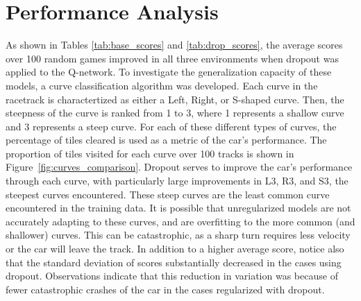 \documentclass{article}
\begin{document}
\section{Performance Analysis}
As shown in Tables \ref{tab:base_scores} and \ref{tab:drop_scores},
the average scores over 100 random games improved in all three
environments when dropout was applied to the Q-network. To
investigate the generalization capacity of these models, a curve 
classification algorithm was developed. Each curve in the racetrack is
charactertized as either a Left, Right, or S-shaped curve. Then, the
steepness of the curve is ranked from 1 to 3, where 1 represents a
shallow curve and 3 represents a steep curve. 
For each of these different types of curves, the percentage
of tiles cleared is used as a metric of the car's performance. 
The proportion of tiles visited for each curve over 100 tracks is
shown in Figure~\ref{fig:curves_comparison}. Dropout serves to
improve the car's performance through each curve, with particularly
large improvements in L3, R3, and S3, the steepest curves
encountered. These steep curves are the least common curve encountered
in the training data. It is possible that unregularized models are not
accurately adapting to these curves, and are overfitting to the more
common (and shallower) curves. This can be catastrophic, as a sharp
turn requires less velocity or the car will leave the track. In
addition to a higher average score, notice also that the standard
deviation of scores substantially  decreased in the cases using
dropout. Observations indicate that this reduction in variation was
because of fewer catastrophic crashes of the car in the cases
regularized with dropout.  
\end{document}
